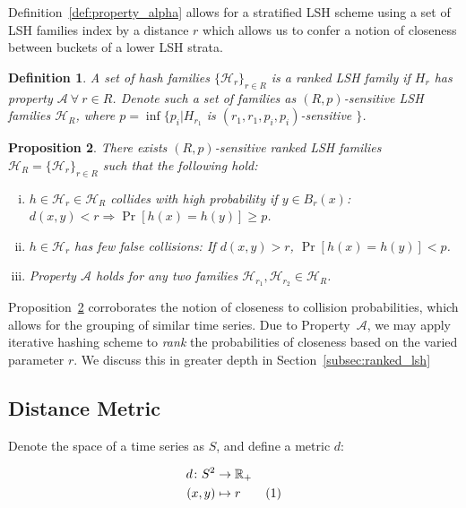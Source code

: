 \documentclass[a4paper]{article}
\newcommand\numberthis{\addtocounter{equation}{1}\tag{\theequation}}
\newtheorem{definition}{Definition}
\newtheorem{proposition}[definition]{Proposition}
\begin{document}
Definition~\ref{def:property_alpha} allows for a stratified LSH scheme using a set of LSH families index by a distance $r$ which allows us to confer a notion of closeness between buckets of a lower LSH strata.

\begin{definition}\label{defn:ranked_lsh}
    A set of hash families ${\{\mathcal{H}_r\}}_{r\in R}$ is a ranked LSH family if $H_r$ has property $\mathscr{A}~\forall~r\in R$.
    Denote such a set of families as $(R,p)$-sensitive LSH families $\mathcal{H}_R$, where $p = \inf\{ p_i | H_{r_1}$ is $(r_1,r_1,p_i,p_i)$-sensitive $\}$.
\end{definition}

\begin{proposition}\label{prop:ranked_lsh}
    There exists $(R,p)$-sensitive ranked LSH families $\mathcal{H}_R = {\{\mathcal{H}_r\}}_{r\in R}$ such that the following hold:
    \begin{enumerate}[(i)]
        \item\label{itm:first}
            $h \in \mathcal{H}_r \in \mathcal{H}_R$ collides with high probability if $y \in B_r(x)$: $d(x,y) < r \Rightarrow \Pr[h(x) = h(y)] \ge p$.
        \item\label{itm:second}
            $h \in \mathcal{H}_r$ has few false collisions: If $d(x,y) > r$, $\Pr[h(x) = h(y)] < p$.
        \item\label{itm:rank_property}
            Property $\mathscr{A}$ holds for any two families $\mathcal{H}_{r_1}, \mathcal{H}_{r_2} \in \mathcal{H}_R$.
    \end{enumerate}
\end{proposition}

Proposition~\ref{prop:ranked_lsh} corroborates the notion of closeness to collision probabilities, which allows for the grouping of similar time series.
Due to Property~$\mathscr{A}$, we may apply iterative hashing scheme to \textit{rank} the probabilities of closeness based on the varied parameter $r$.
We discuss this in greater depth in Section~\ref{subsec:ranked_lsh}

\subsection{Distance Metric}
Denote the space of a time series as $S$, and define a metric $d$:

\begin{align*}
    d \colon S^2 &\to \mathbb{R}_{+}\\
    (x,y) &\mapsto r \numberthis
\end{align*}
\end{document}
